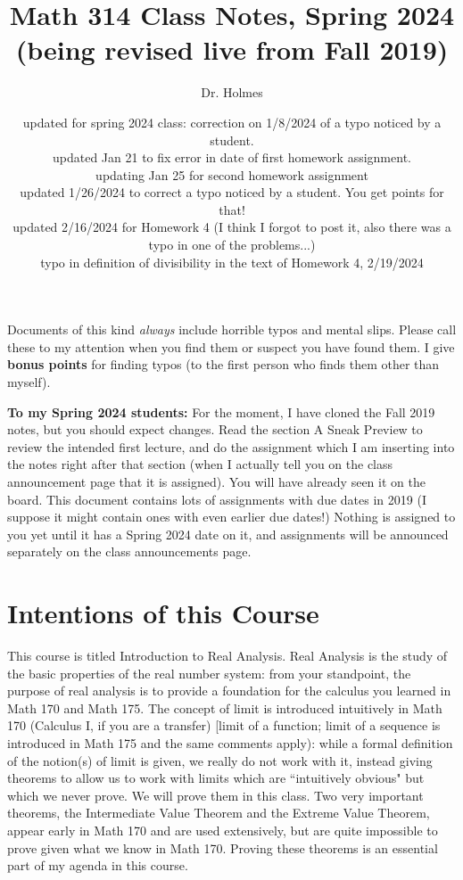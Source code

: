 \documentclass[12pt]{article}
\title{Math 314 Class Notes, Spring 2024 (being revised live from Fall 2019)}
\author{Dr. Holmes}
\date{updated for spring 2024 class:  correction on 1/8/2024 of a typo noticed by a student.\\updated Jan 21 to fix error in date of first homework assignment.  \\ updating Jan 25 for second homework assignment\\updated 1/26/2024 to correct a typo noticed by a student.  You get points for that!\\ updated 2/16/2024 for Homework 4 (I think I forgot to post it, also there was a typo in one of the problems...)\\typo in definition of divisibility in the text of Homework 4, 2/19/2024}
\begin{document}
\maketitle

\newpage

\tableofcontents

\newpage

Documents of this kind {\em always\/} include horrible typos and mental slips.  Please call these to my attention when you find them or suspect you have found them.  I give {\bf bonus points} for finding typos (to the first person who finds them other than myself).

{\bf To my Spring 2024 students:}  For the moment, I have cloned the Fall 2019 notes, but you should expect changes.   Read the section A Sneak Preview to review the intended first lecture, and do the assignment which I am inserting into the notes right after that section (when I actually tell you on the class announcement page that it is assigned).   You will have already seen it on the board.  This document contains lots of assignments with due dates in 2019 (I suppose it might contain ones with even earlier due dates!)  Nothing is assigned to you yet until it has a Spring 2024 date on it, and assignments will be announced separately on the class announcements page.

\section{Intentions of this Course}

This course is titled Introduction to Real Analysis.  Real Analysis is the study of the basic properties of the real number system:  from your standpoint, the purpose of real analysis is to provide a foundation for the calculus you learned in Math 170 and Math 175.  The concept of limit is introduced intuitively in Math 170 (Calculus I, if you are a transfer) [limit of a function; limit of a sequence is introduced in Math 175 and the same comments apply):  while a formal definition of the notion(s) of limit is given, we really do not work with it, instead giving theorems to allow us to work with limits which are ``intuitively obvious" but which we never prove.  We will prove them in this class.  Two very important theorems, the Intermediate Value Theorem and the Extreme Value Theorem, appear early in Math 170 and are used extensively, but are quite impossible to prove given what we know in Math 170.  Proving these theorems is an essential part of my agenda in this course.
\end{document}
